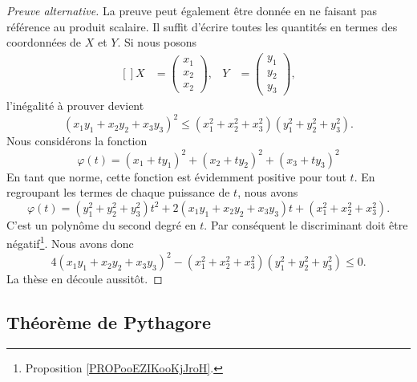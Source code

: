 \begin{proof}[Preuve alternative]
	La preuve peut également être donnée en ne faisant pas référence au produit scalaire. Il suffit d'écrire toutes les quantités en termes des coordonnées de \( X\) et \( Y\). Si nous posons
	\begin{equation}
		\begin{aligned}[]
			X & =\begin{pmatrix}
				     x_1 \\
				     x_2 \\
				     x_2
			     \end{pmatrix},
			  & Y                & =\begin{pmatrix}
				                        y_1 \\
				                        y_2 \\
				                        y_3
			                        \end{pmatrix},
		\end{aligned}
	\end{equation}
	l'inégalité à prouver devient
	\begin{equation}
		(x_1y_1+x_2y_2+x_3y_3)^2\leq (x_1^2+x_2^2+x_3^2)(y_1^2+y_2^2+y_3^2).
	\end{equation}
	Nous considérons la fonction
	\begin{equation}
		\varphi(t)=(x_1+ty_1)^2+(x_2+ty_2)^2+(x_3+ty_3)^2
	\end{equation}
	En tant que norme, cette fonction est évidemment positive pour tout \( t\). En regroupant les termes de chaque puissance de \( t\), nous avons
	\begin{equation}
		\varphi(t)=(y_1^2+y_2^2+y_3^2)t^2+2(x_1y_1+x_2y_2+x_3y_3)t+(x_1^2+x_2^2+x_3^2).
	\end{equation}
	C'est un polynôme du second degré en \( t\). Par conséquent le discriminant doit être négatif\footnote{Proposition \ref{PROPooEZIKooKjJroH}.}. Nous avons donc
	\begin{equation}
		4(x_1y_1+x_2y_2+x_3y_3)^2-(x_1^2+x_2^2+x_3^2)(y_1^2+y_2^2+y_3^2)\leq 0.
	\end{equation}
	La thèse en découle aussitôt.
\end{proof}

\subsection{Théorème de Pythagore}

